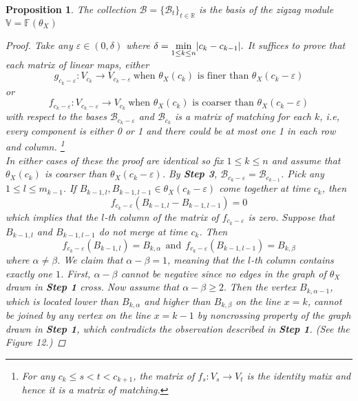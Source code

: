 \documentclass[a4paper,12pt]{article}
\newtheorem{proposition}{Proposition}[section]
\newcommand{\eps}{\varepsilon}
\DeclarePairedDelimiter{\abs}{\lvert}{\rvert}
\begin{document}
\begin{proposition} The collection $\mathcal{B}=\{\mathcal{B}_t\}_{t\in\mathbb{R}}$ is the basis of the zigzag module $\mathbb{V}=\mathbb{F}(\theta_X)$
\begin{proof}
	Take any  $\eps\in (0,\delta)$ where $\displaystyle \delta= \min_{1\leq k \leq n}\abs{c_k-c_{k-1}}. $
	It suffices to prove that each matrix of linear maps, either $$g_{c_k-\eps}:V_{c_k}\rightarrow V_{c_k-\eps}\ \mbox{when $\theta_X(c_k)$ is finer than $\theta_X(c_k-\eps)$}$$ or $$f_{c_k-\eps}:V_{c_k-\eps}\rightarrow V_{c_k} \ \mbox{when $\theta_X(c_k)$ is coarser than $\theta_X(c_k-\eps)$}$$ with respect to the bases $\mathcal{B}_{c_k-\eps}$ and $\mathcal{B}_{c_k}$ is a matrix of matching for each $k$, i.e, every component is either 0 or 1 and there could be at most one 1 in each row and column. \footnote{For any $c_k\leq s< t <c_{k+1}$, the matrix of $f_{s}:V_s\rightarrow V_t$ is the identity matix and hence it is a matrix of matching.}\\
	
	
	In either cases of these the proof are identical so fix $1\leq k\leq n$ and assume that $\theta_X(c_k)$ is coarser than $\theta_X(c_k-\eps)$. By \textbf{Step 3}, $\mathcal{B}_{c_k-\eps}=\mathcal{B}_{c_{k-1}}$. Pick any $1\leq l \leq m_{k-1}$. If $B_{k-1,l}, B_{k-1,l-1}\in \theta_X(c_k-\eps)$ come together at time $c_k$, then $$f_{c_k-\eps}(B_{k-1,l}-B_{k-1,l-1})=0$$ which implies that the $l$-th column of the matrix of $f_{c_k-\eps}$ is zero. Suppose that $B_{k-1,l}$ and  $B_{k-1,l-1}$ do not merge at time $c_k$. Then $$f_{c_k-\eps}(B_{k-1,l})=B_{k,\alpha}\ \ \mbox{and}\ \ f_{c_k-\eps}(B_{k-1,l-1})=B_{k,\beta}$$ where $\alpha\neq \beta$. We claim that $\alpha-\beta=1$, meaning that the $l$-th column contains exactly one $1$. First, $\alpha-\beta$ cannot be negative since no edges in the graph of $\theta_X$ drawn in \textbf{Step 1} cross. Now assume that $\alpha-\beta\geq 2.$ Then the vertex $B_{k,\alpha-1}$, which is located lower than $B_{k,\alpha}$ and higher than $B_{k,\beta}$ on the line $x=k$, cannot be joined by any vertex on the line $x=k-1$ by noncrossing property of the graph drawn in \textbf{Step 1}, which contradicts the observation described in \textbf{Step 1}. (See the Figure 12.)
	

\end{proof}
\end{proposition}
\end{document}
